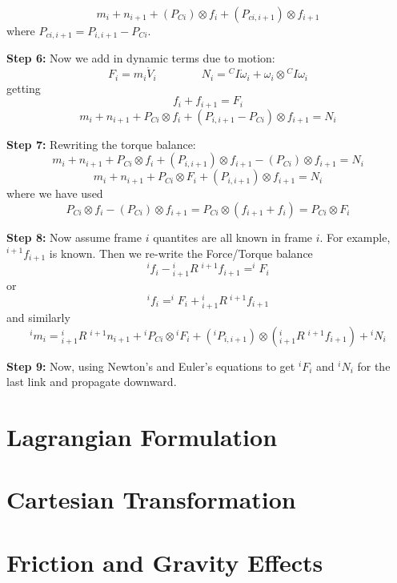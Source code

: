 \[
m_i+n_{i+1}+(P_{Ci})\otimes f_i+(P_{ci,i+1})\otimes f_{i+1}
\]
where $P_{ci,i+1} = P_{i,i+1}-P_{Ci}$.


{\bf Step 6: }
Now we add in dynamic terms due to motion:
\[
F_i = m_i\dot{V}_i \qquad  \qquad N_i ={^CI}\dot{\omega}_i+\omega_i\otimes{^CI}\omega_i
\]
getting
\begin{equation}
f_i+f_{i+1} = F_i
\end{equation}
\begin{equation}
m_i+n_{i+1}+P_{Ci}\otimes f_i + (P_{i,i+1}-P_{Ci})\otimes f_{i+1} = N_i
\end{equation}

{\bf Step 7: } Rewriting the torque balance:
\[
m_i+n_{i+1}+P_{Ci}\otimes f_i + (P_{i,i+1})\otimes f_{i+1} - (P_{Ci})\otimes f_{i+1} = N_i
\]
\begin{equation}
m_i+n_{i+1}+P_{Ci}\otimes F_i + (P_{i,i+1})\otimes f_{i+1} = N_i
\end{equation}
where we have used
\[
P_{Ci}\otimes f_i - (P_{Ci})\otimes f_{i+1} = P_{Ci}\otimes (f_{i+1}+f_{i}) = P_{Ci}\otimes F_i
\]

{\bf Step 8: }
Now assume frame $i$ quantites are all known in frame $i$.  For example, $^{i+1}f_{i+1}$ is known.  Then we re-write the Force/Torque balance
\[
^if_i -  {^i_{i+1}R}\; {^{i+1}f_{i+1}} =  ^iF_i
\]
or
\begin{equation}
^if_i = ^iF_i + {^i_{i+1}R} \: {^{i+1}f_{i+1}}
\end{equation}
and similarly
\begin{equation}
^im_i = {^i_{i+1}R}\;{^{i+1}n_{i+1}}+{^iP_{Ci}} \otimes {^iF_i} + (^iP_{i,i+1})\otimes \left( {^i_{i+1}R}\;{^{i+1}f_{i+1}}\right) + {^iN_i}
\end{equation}

{\bf Step 9: }
Now, using Newton's and Euler's equations to get ${^iF_i}$ and ${^iN_i}$ for the last link and propagate downward.







\section{Lagrangian Formulation}
\section{Cartesian Transformation}


\section{Friction and Gravity Effects}

